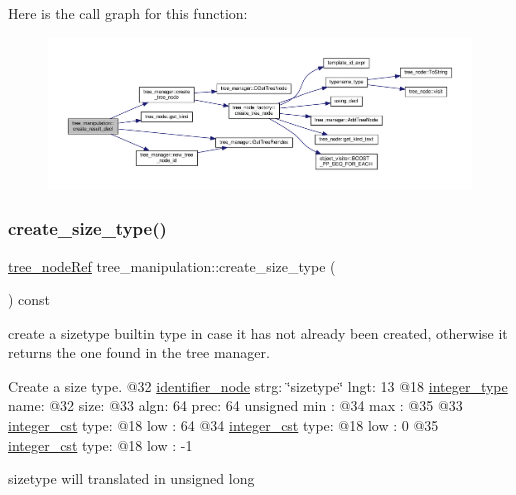 Here is the call graph for this function\+:
\nopagebreak
\begin{figure}[H]
\begin{center}
\leavevmode
\includegraphics[width=350pt]{d0/d99/classtree__manipulation_a7e9adc5785c0b55a5720e70fd7967a35_cgraph}
\end{center}
\end{figure}
\mbox{\label{classtree__manipulation_a5db8217303c41bbc32245048823ad804}} 
\subsubsection{\texorpdfstring{create\+\_\+size\+\_\+type()}{create\_size\_type()}}
{\footnotesize\ttfamily \hyperlink{tree__node_8hpp_a6ee377554d1c4871ad66a337eaa67fd5}{tree\+\_\+node\+Ref} tree\+\_\+manipulation\+::create\+\_\+size\+\_\+type (\begin{DoxyParamCaption}{ }\end{DoxyParamCaption}) const}



create a sizetype builtin type in case it has not already been created, otherwise it returns the one found in the tree manager. 

Create a size type. @32 \hyperlink{structidentifier__node}{identifier\+\_\+node} strg\+: \char`\"{}sizetype\char`\"{} lngt\+: 13 @18 \hyperlink{structinteger__type}{integer\+\_\+type} name\+: @32 size\+: @33 algn\+: 64 prec\+: 64 unsigned min \+: @34 max \+: @35 @33 \hyperlink{structinteger__cst}{integer\+\_\+cst} type\+: @18 low \+: 64 @34 \hyperlink{structinteger__cst}{integer\+\_\+cst} type\+: @18 low \+: 0 @35 \hyperlink{structinteger__cst}{integer\+\_\+cst} type\+: @18 low \+: -\/1

sizetype will translated in unsigned long

